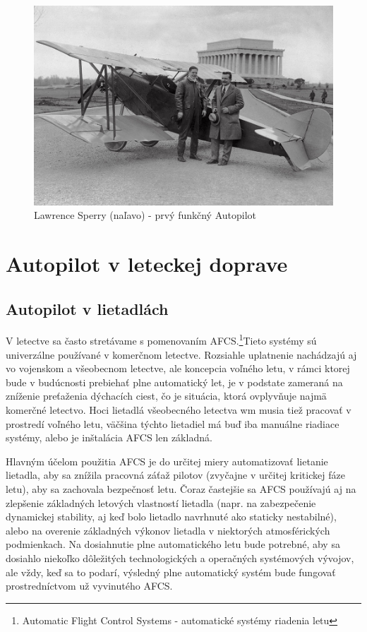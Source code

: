\documentclass[10pt,twoside,slovak,a4paper]{article}
\begin{document}
\begin{figure}[tbh]
\centering
\includegraphics[scale=0.27]{obr2.jpg}
\caption{Lawrence Sperry (naľavo) - prvý funkčný Autopilot\cite{Sperry}}
\label{f:obr2}
\end{figure}

\section{Autopilot v leteckej doprave} 

\subsection{Autopilot v lietadlách} \label{AVL}
V letectve sa často stretávame s pomenovaním AFCS.\footnote{Automatic Flight Control Systems - automatické systémy riadenia letu}Tieto systémy sú univerzálne používané v komerčnom letectve. Rozsiahle uplatnenie nachádzajú aj vo vojenskom a všeobecnom letectve, ale koncepcia voľného letu, v rámci ktorej bude v budúcnosti prebiehať plne automatický let, je v podstate zameraná na zníženie preťaženia dýchacích ciest, čo je situácia, ktorá ovplyvňuje najmä komerčné letectvo. Hoci lietadlá všeobecného letectva wm musia tiež pracovať v prostredí voľného letu, väčšina týchto lietadiel má buď iba manuálne riadiace systémy, alebo je inštalácia AFCS len základná.\cite{JenieAFCS}

Hlavným účelom použitia AFCS je do určitej miery automatizovať lietanie lietadla, aby sa znížila pracovná záťaž pilotov (zvyčajne v určitej kritickej fáze letu), aby sa zachovala bezpečnosť letu. Čoraz častejšie sa AFCS používajú aj na zlepšenie základných letových vlastností lietadla (napr. na zabezpečenie dynamickej stability, aj keď bolo lietadlo navrhnuté ako staticky nestabilné), alebo na overenie základných výkonov lietadla v niektorých atmosférických podmienkach. Na dosiahnutie plne automatického letu bude potrebné, aby sa dosiahlo niekoľko dôležitých technologických a operačných systémových vývojov, ale vždy, keď sa to podarí, výsledný plne automatický systém bude fungovať prostredníctvom už vyvinutého AFCS.\cite{McLeanAFCS}
\end{document}

